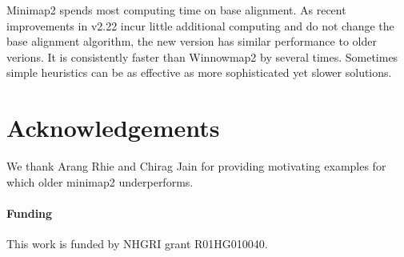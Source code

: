 \documentclass{bioinfo}
\begin{document}
Minimap2 spends most computing time on base alignment. As recent improvements
in v2.22 incur little additional computing and do not change the base alignment
algorithm, the new version has similar performance to older verions. It is
consistently faster than Winnowmap2 by several times. Sometimes simple
heuristics can be as effective as more sophisticated yet slower solutions.

\section*{Acknowledgements}
We thank Arang Rhie and Chirag Jain for providing motivating examples for which
older minimap2 underperforms.

\paragraph{Funding\textcolon} This work is funded by NHGRI grant R01HG010040.


\end{document}
